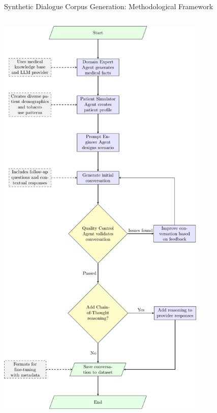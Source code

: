 \begin{frame}{Synthetic Dialogue Corpus Generation: Methodological Framework}
\begin{columns}
    \begin{column}{0.5\textwidth}
      \begin{center}
        \includegraphics[width=0.75\textwidth, height=0.70\paperheight]{presentation/images/Pictures/conversation_generation_flow.pdf}
      \end{center}
    \end{column}
  \end{columns}
\end{frame}